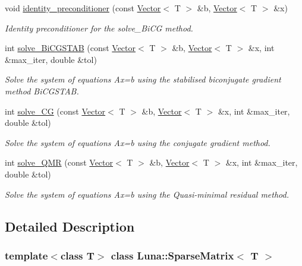 \begin{DoxyCompactItemize}
void \hyperlink{classLuna_1_1SparseMatrix_ac196d00210b58f3f62352054f4241411}{identity\+\_\+preconditioner} (const \hyperlink{classLuna_1_1Vector}{Vector}$<$ T $>$ \&b, \hyperlink{classLuna_1_1Vector}{Vector}$<$ T $>$ \&x)
\begin{DoxyCompactList}\small\item\em Identity preconditioner for the solve\+\_\+\+Bi\+CG method. \end{DoxyCompactList}\item 
int \hyperlink{classLuna_1_1SparseMatrix_a8fe4fe6d60878d4b23a6895f1a5dc59d}{solve\+\_\+\+Bi\+C\+G\+S\+T\+AB} (const \hyperlink{classLuna_1_1Vector}{Vector}$<$ T $>$ \&b, \hyperlink{classLuna_1_1Vector}{Vector}$<$ T $>$ \&x, int \&max\+\_\+iter, double \&tol)
\begin{DoxyCompactList}\small\item\em Solve the system of equations Ax=b using the stabilised biconjugate gradient method Bi\+C\+G\+S\+T\+AB. \end{DoxyCompactList}\item 
int \hyperlink{classLuna_1_1SparseMatrix_a163219e4a5009de66aa538a6be304249}{solve\+\_\+\+CG} (const \hyperlink{classLuna_1_1Vector}{Vector}$<$ T $>$ \&b, \hyperlink{classLuna_1_1Vector}{Vector}$<$ T $>$ \&x, int \&max\+\_\+iter, double \&tol)
\begin{DoxyCompactList}\small\item\em Solve the system of equations Ax=b using the conjugate gradient method. \end{DoxyCompactList}\item 
int \hyperlink{classLuna_1_1SparseMatrix_a45bef00e3aaeae37b3faf7de22e5e6f0}{solve\+\_\+\+Q\+MR} (const \hyperlink{classLuna_1_1Vector}{Vector}$<$ T $>$ \&b, \hyperlink{classLuna_1_1Vector}{Vector}$<$ T $>$ \&x, int \&max\+\_\+iter, double \&tol)
\begin{DoxyCompactList}\small\item\em Solve the system of equations Ax=b using the Quasi-\/minimal residual method. \end{DoxyCompactList}\end{DoxyCompactItemize}


\subsection{Detailed Description}
\subsubsection*{template$<$class T$>$\newline
class Luna\+::\+Sparse\+Matrix$<$ T $>$}

